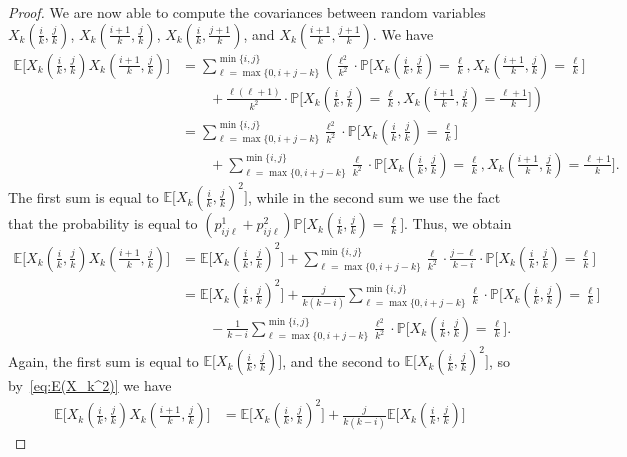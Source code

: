 \documentclass[12pt,a4paper]{amsart}
\theoremstyle{definition}
\newcommand{\PP}{\mathbb{P}}
\newcommand{\EE}{\mathbb{E}}
\begin{document}
\begin{proof}
We are now able to compute the covariances between random variables $X_k(\tfrac{i}{k},\tfrac{j}{k})$, $X_k(\tfrac{i+1}{k},\tfrac{j}{k})$, $X_k(\tfrac{i}{k},\tfrac{j+1}{k})$, and $X_k(\tfrac{i+1}{k},\tfrac{j+1}{k})$.
We have
\begin{align*}
    \EE\big[X_k(\tfrac{i}{k},\tfrac{j}{k})X_k(\tfrac{i+1}{k},\tfrac{j}{k})\big] &= \sum_{\ell=\max \{0,  i+j-k \}}^{\min \{i,j \}} \left(\frac{\ell^2}{k^2}\cdot \PP\big[X_k(\tfrac{i}{k},\tfrac{j}{k}) = \tfrac{\ell}{k}, X_k(\tfrac{i+1}{k},\tfrac{j}{k}) = \tfrac{\ell}{k}\big] \right.\\
    & \left.\qquad + \frac{\ell(\ell+1)}{k^2}\cdot \PP\big[X_k(\tfrac{i}{k},\tfrac{j}{k}) = \tfrac{\ell}{k}, X_k(\tfrac{i+1}{k},\tfrac{j}{k})= \tfrac{\ell+1}{k}\big]\right)\\
    &= \sum_{\ell=\max \{0,  i+j-k \}}^{\min \{i,j \}} \frac{\ell^2}{k^2}\cdot \PP\big[X_k(\tfrac{i}{k},\tfrac{j}{k}) = \tfrac{\ell}{k}\big] \\
    & \qquad + \sum_{\ell=\max \{0,  i+j-k \}}^{\min \{i,j \}} \frac{\ell}{k^2}\cdot \PP\big[X_k(\tfrac{i}{k},\tfrac{j}{k}) = \tfrac{\ell}{k}, X_k(\tfrac{i+1}{k},\tfrac{j}{k})= \tfrac{\ell+1}{k}\big].
\end{align*}
The first sum is equal to $\EE\big[X_k(\tfrac{i}{k},\tfrac{j}{k})^2\big]$, while in the second sum we use the fact that the probability is equal to $(p_{ij\ell}^1 + p_{ij\ell}^2)\PP\big[X_k(\tfrac{i}{k},\tfrac{j}{k}) = \tfrac{\ell}{k}\big]$.
Thus, we obtain
\begin{align*}
    \EE\big[X_k(\tfrac{i}{k},\tfrac{j}{k})X_k(\tfrac{i+1}{k},\tfrac{j}{k})\big] &= \EE\big[X_k(\tfrac{i}{k},\tfrac{j}{k})^2\big] + \sum_{\ell=\max \{0,  i+j-k \}}^{\min \{i,j \}} \frac{\ell}{k^2}\cdot \frac{j-\ell}{k-i}\cdot \PP\big[X_k(\tfrac{i}{k},\tfrac{j}{k}) = \tfrac{\ell}{k}\big]\\
    &= \EE\big[X_k(\tfrac{i}{k},\tfrac{j}{k})^2\big] + \frac{j}{k(k-i)}\sum_{\ell=\max \{0,  i+j-k \}}^{\min \{i,j \}} \frac{\ell}{k}\cdot \PP\big[X_k(\tfrac{i}{k},\tfrac{j}{k}) = \tfrac{\ell}{k}\big] \\
    & \qquad - \frac{1}{k-i}\sum_{\ell=\max \{0,  i+j-k \}}^{\min \{i,j \}} \frac{\ell^2}{k^2}\cdot \PP\big[X_k(\tfrac{i}{k},\tfrac{j}{k}) = \tfrac{\ell}{k}\big].
\end{align*}
Again, the first sum is equal to $\EE\big[X_k(\tfrac{i}{k},\tfrac{j}{k})\big]$, and the second to $\EE\big[X_k(\tfrac{i}{k},\tfrac{j}{k})^2\big]$, so by~\eqref{eq:E(X_k^2)} we have
\begin{align*}
    \EE\big[X_k(\tfrac{i}{k},\tfrac{j}{k})X_k(\tfrac{i+1}{k},\tfrac{j}{k})\big] &= \EE\big[X_k(\tfrac{i}{k},\tfrac{j}{k})^2\big] + \frac{j}{k(k-i)}\EE\big[X_k(\tfrac{i}{k},\tfrac{j}{k})\big]

\end{align*}
\end{proof}
\end{document}

